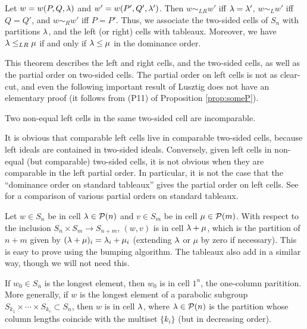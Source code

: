 \begin{thm}\label{thm:soergelcells}
Let $w = w(P,Q,\lambda)$ and $w' = w(P',Q',\lambda')$. Then $w \sim_{LR} w'$ iff $\lambda = \lambda'$, $w \sim_L w'$ iff $Q=Q'$, and $w \sim_R w'$ iff $P=P'$. Thus, we associate the two-sided cells of $S_n$ with partitions $\lambda$, and the left (or right) cells with tableaux. Moreover, we have $\lambda \le_{LR} \mu$ if and only if $\lambda \le \mu$ in the dominance order.
\end{thm}

This theorem describes the left and right cells, and the two-sided cells, as well as the partial order on two-sided cells. The partial order on left cells is not as clear-cut, and even the following important result of Lusztig does not have an elementary proof (it follows from (P11) of Proposition \ref{prop:someP}).

\begin{prop} \label{prop:leftincomp} Two non-equal left cells in the same two-sided cell are incomparable. \end{prop}

\begin{remark} It is obvious that comparable left cells live in comparable two-sided cells, because left ideals are contained in two-sided ideals. Conversely, given left cells in
non-equal (but comparable) two-sided cells, it is not obvious when they are comparable in the left partial order. In particular, it is not the case that the ``dominance order on standard
tableaux'' gives the partial order on left cells. See \cite{Taskin} for a comparison of various partial orders on standard tableaux. \end{remark}

\begin{example}
Let $w\in S_n$ be in cell $\lambda\in {\mathcal{P}}(n)$ and $v\in S_m$ be in cell $\mu\in {\mathcal{P}}(m)$. With respect to the inclusion $S_n\times S_m\rightarrow S_{n+m}$, $(w,v)$ is in cell $\lambda+\mu$, which is the partition of $n+m$ given by $(\lambda+\mu)_i = \lambda_i+\mu_i$ (extending $\lambda$ or $\mu$ by zero if necessary).   This is easy to prove using the bumping algorithm.  The tableaux also add in a similar way, though we will not need this.
\end{example}

\begin{example}\label{ex:longesteltcell}
If $w_0\in S_n$ is the longest element, then $w_0$ is in cell $1^n$, the one-column paritition.  More generally, if $w$ is the longest element of a parabolic subgroup $S_{k_1}\times \cdots \times S_{k_r}\subset S_n$, then $w$ is in cell $\lambda$, where $\lambda\in{\mathcal{P}}(n)$ is the partition whose column lengths coincide with the multiset $\{k_i\}$ (but in decreasing order).
\end{example}

